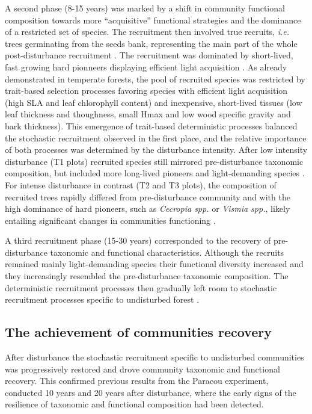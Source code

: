 \documentclass[fleqn,10pt]{ArtEcoFoG} %
\begin{document}
A second phase (8-15 years) was marked by a shift in community
functional composition towards more ``acquisitive'' functional
strategies and the dominance of a restricted set of species. The
recruitment then involved true recruits, \emph{i.e.} trees germinating
from the seeds bank, representing the main part of the whole
post-disturbance recruitment \citep{Lawton1988}. The recruitment was
dominated by short-lived, fast growing hard pionneers displaying
efficient light acquisition \citep{Wright2004, Chave2009b, Herault2011}.
As already demonstrated in temperate forests, the pool of recruited
species was restricted by trait-based selection processes favoring
species with efficient light acquisition (high SLA and leaf chlorophyll
content) and inexpensive, short-lived tissues (low leaf thickness and
thoughness, small Hmax and low wood specific gravity and bark
thickness)\citep{Chave2004, Kunstler2016}. This emergence of trait-based
deterministic processes balanced the stochastic recruitment observed in
the first place, and the relative importance of both processes was
determined by the disturbance intensity. After low intensity disturbance
(T1 plots) recruited species still mirrored pre-disturbance taxonomic
composition, but included more long-lived pioneers and light-demanding
species \citep{Bongers2009}. For intense disturbance in contrast (T2 and
T3 plots), the composition of recruited trees rapidly differed from
pre-disturbance community and with the high dominance of hard pioneers,
such as \emph{Cecropia spp.} or \emph{Vismia spp.}, likely entailing
significant changes in communities functioning \citep{Diaz2005}.

A third recruitment phase (15-30 years) corresponded to the recovery of
pre-disturbance taxonomic and functional characteristics. Although the
recruits remained mainly light-demanding species their functional
diversity increased and they increasingly resembled the pre-disturbance
taxonomic composition. The deterministic recruitment processes then
gradually left room to stochastic recruitment processes specific to
undisturbed forest \citep{Lawton1988, Chave2004}.

\subsection{The achievement of communities
recovery}\label{the-achievement-of-communities-recovery}

After disturbance the stochastic recruitment specific to undisturbed
communities was progressively restored and drove community taxonomic and
functional recovery. This confirmed previous results from the Paracou
experiment, conducted 10 years \citep{Molino2001} and 20 years
\citep{Baraloto2012a} after disturbance, where the early signs of the
resilience of taxonomic and functional composition had been detected.
\end{document}
